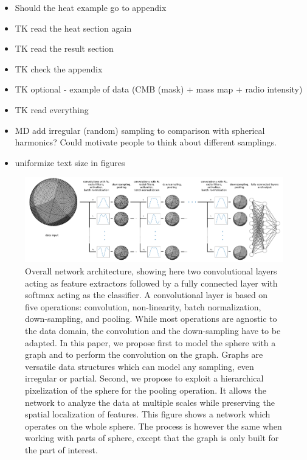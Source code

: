 \documentclass[final,twocolumn,3p,times,authoryear]{elsarticle}
\newcommand{\nati}[1]{{\color[rgb]{.1,.6,.1}{#1}}}
\newcommand{\1}{\b{1}}              %
\newcommand{\0}{\b{0}}              %
\begin{document}
\begin{itemize}[noitemsep,topsep=0pt,parsep=0pt,partopsep=0pt]
    \item Should the heat example go to appendix
    \item TK read the heat section again
    \item TK read the result section
    \item TK check the appendix
    \item TK optional - example of data (CMB (mask) + mass map + radio intensity)
    \item TK read everything
	\item MD add irregular (random) sampling to comparison with spherical harmonics? Could motivate people to think about different samplings.
	\item uniformize text size in figures
\end{itemize}

\begin{figure}
	\centering
	\includegraphics[width=\linewidth]{figure_architecture}
	\caption{Overall network architecture, showing here two convolutional layers acting as feature extractors followed by a fully connected layer with softmax acting as the classifier. \nati{add the stat layer?} A convolutional layer is based on five operations: convolution, non-linearity, batch normalization, down-sampling, and pooling. While most operations are agnostic to the data domain, the convolution and the down-sampling have to be adapted. In this paper, we propose first to model the sphere with a graph and to perform the convolution on the graph. Graphs are versatile data structures which can model any sampling, even irregular or partial. Second, we propose to exploit a hierarchical pixelization of the sphere for the pooling operation. It allows the network to analyze the data at multiple scales while preserving the spatial localization of features. This figure shows a network which operates on the whole sphere. The process is however the same when working with parts of sphere, except that the graph is only built for the part of interest.}
	\label{fig:architecture}
\end{figure}
\end{document}
